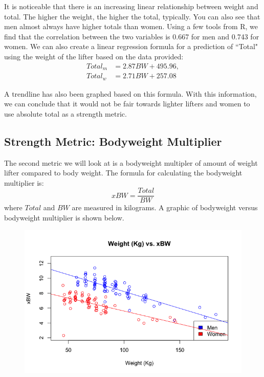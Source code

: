 \documentclass[10pt,letterpaper]{article}
\begin{document}
    It is noticeable that there is an increasing linear relationship between weight and total. The higher the weight, the higher the total, typically. You can also see that men almost always have higher totals than women.
    Using a few tools from R, we find that the correlation between the two variables is 0.667 for men and 0.743 for women. We can also create a linear regression formula for a prediction of ``Total" using the weight of the lifter based on the data provided:
    \begin{align*}
    Total_{m} &= 2.87BW + 495.96, \\
    Total_{w} &= 2.71BW + 257.08
    \end{align*}

     A trendline has also been graphed based on this formula. With this information, we can conclude that it would not be fair towards lighter lifters and women to use absolute total as a strength metric. 

    \subsection{Strength Metric: Bodyweight Multiplier}
    The second metric we will look at is a bodyweight multipler of amount of weight lifter compared to body weight. The formula for calculating the bodyweight multiplier is: $$xBW = \frac{Total}{BW}$$ where $Total$ and $BW$ are measured in kilograms. A graphic of bodyweight versus bodyweight multiplier is shown below. 

    \begin{figure}[H]
        \center
        \includegraphics[width=35em]{weightVSbw.png}
        \label{xBW}
    \end{figure}
\end{document}
